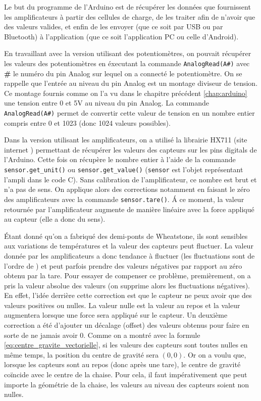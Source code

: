 \documentclass{polytech/polytech}
\begin{document}
Le but du programme de l'Arduino est de récupérer les données que fournissent les amplificateurs à partir des cellules de charge, de les traiter afin de n'avoir que des valeurs valides, et enfin de les envoyer (que ce soit par USB ou par Bluetooth) à l'application (que ce soit l'application PC ou celle d'Android).

En travaillant avec la version utilisant des potentiomètres, on pouvait récupérer les valeurs des potentiomètres en éxecutant la commande \texttt{AnalogRead(A\#)} avec \textbf{\#} le numéro du pin Analog sur lequel on a connecté le potentiomètre. On se rappelle que l'entrée au niveau du pin Analog est un montage diviseur de tension. Ce montage fournis comme on l'a vu dans le chapitre précédent \ref{chap:arduino} une tension entre 0 et 5V au niveau du pin Analog. La commande  \texttt{AnalogRead(A\#)} permet de convertir cette valeur de tension en un nombre entier compris entre 0 et 1023 (donc 1024 valeurs possibles).

Dans la version utilisant les amplificateurs, on a utilisé la librairie HX711 (site internet \cite{hx711}) permettant de récupérer les valeurs des capteurs sur les pins digitals de l'Arduino. 
Cette fois on récupère le nombre entier à l'aide de la commande \texttt{sensor.get\_unit()} ou \texttt{sensor.get\_value()} (\texttt{sensor} est l'objet représentant l'ampli dans le code C). 
Sans calibration de l'amplificateur, ce nombre est brut et n'a pas de sens. 
On applique alors des corrections notamment en faisant le zéro des amplificateurs avec la commande \texttt{sensor.tare()}.
 \'A ce moment, la valeur retournée par l'amplificateur augmente de manière linéaire avec la force appliqué au capteur (elle a donc du sens).

\'Etant donné qu'on a fabriqué des demi-ponts de Wheatstone, ils sont sensibles aux variations de températures et la valeur des capteurs peut fluctuer. 
La valeur donnée par les amplificateurs a donc tendance à fluctuer (les fluctuations sont de l'ordre de ) et peut parfois prendre des valeurs négatives par rapport au zéro obtenu par la tare.
 Pour essayer de compenser ce problème, premièrement, on a pris la valeur absolue des valeurs (on supprime alors les fluctuations négatives). 
En effet, l'idée derrière cette correction est que le capteur ne peux avoir que des valeurs positives ou nulles.
 La valeur nulle est la valeur au repos et la valeur augmentera lorsque une force sera appliqué sur le capteur.
  Un deuxième correction a été d'ajouter un décalage (offset) des valeurs obtenus pour faire en sorte de ne jamais avoir 0. 
  Comme on a montré avec la formule \eqref{eq:centre_gravite_vectorielle}, si les valeurs des capteurs sont toutes nulles en même temps, la position du centre de gravité sera $(0, 0)$. 
  Or on a voulu que, lorsque les capteurs sont au repos (donc après une tare), le centre de gravité coïncide avec le centre de la chaise.
   Pour cela, il faut impérativement que peut importe la géométrie de la chaise, les valeurs au niveau des capteurs soient non nulles.
\end{document}
